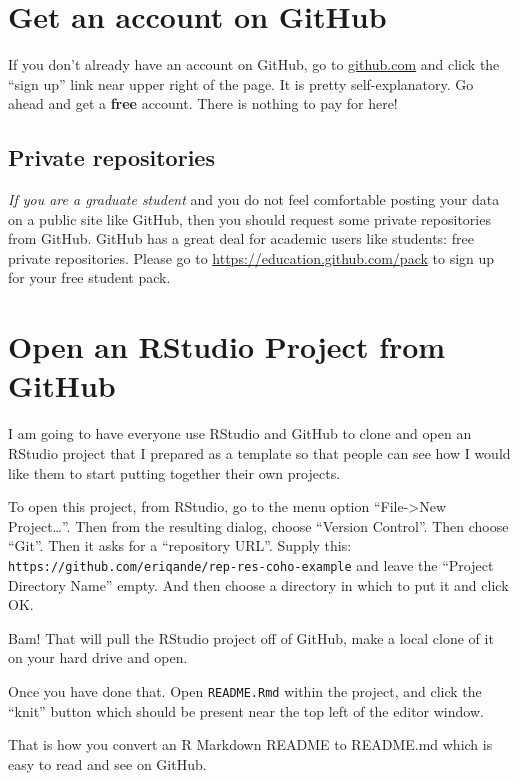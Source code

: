 \documentclass[]{book}
\theoremstyle{definition}
\theoremstyle{definition}
\theoremstyle{remark}
\begin{document}
\section{Get an account on GitHub}\label{get-an-account-on-github}

If you don't already have an account on GitHub, go to \url{github.com}
and click the ``sign up'' link near upper right of the page. It is
pretty self-explanatory. Go ahead and get a \textbf{free} account. There
is nothing to pay for here!

\subsection{Private repositories}\label{private-repositories}

\emph{If you are a graduate student} and you do not feel comfortable
posting your data on a public site like GitHub, then you should request
some private repositories from GitHub. GitHub has a great deal for
academic users like students: free private repositories. Please go to
\url{https://education.github.com/pack} to sign up for your free student
pack.

\section{Open an RStudio Project from
GitHub}\label{open-an-rstudio-project-from-github}

I am going to have everyone use RStudio and GitHub to clone and open an
RStudio project that I prepared as a template so that people can see how
I would like them to start putting together their own projects.

To open this project, from RStudio, go to the menu option
``File-\textgreater{}New Project\ldots{}''. Then from the resulting
dialog, choose ``Version Control''. Then choose ``Git''. Then it asks
for a ``repository URL''. Supply this:
\texttt{https://github.com/eriqande/rep-res-coho-example} and leave the
``Project Directory Name'' empty. And then choose a directory in which
to put it and click OK.

Bam! That will pull the RStudio project off of GitHub, make a local
clone of it on your hard drive and open.

Once you have done that. Open \texttt{README.Rmd} within the project,
and click the ``knit'' button which should be present near the top left
of the editor window.

That is how you convert an R Markdown README to README.md which is easy
to read and see on GitHub.
\end{document}
